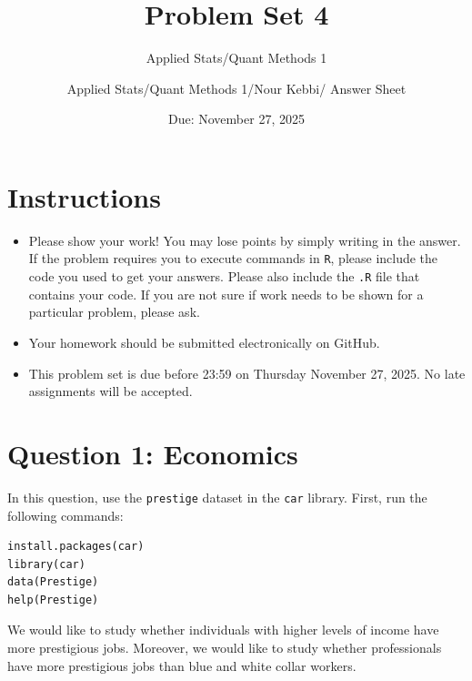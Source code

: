 \documentclass[12pt,letterpaper]{article}
\title{Problem Set 4}
\date{Due: November 27, 2025}
\author{Applied Stats/Quant Methods 1}
\author{Applied Stats/Quant Methods 1/Nour Kebbi/ Answer Sheet}
\begin{document}
	\maketitle
	\section*{Instructions}
	\begin{itemize}
		\item Please show your work! You may lose points by simply writing in the answer. If the problem requires you to execute commands in \texttt{R}, please include the code you used to get your answers. Please also include the \texttt{.R} file that contains your code. If you are not sure if work needs to be shown for a particular problem, please ask.
		\item Your homework should be submitted electronically on GitHub.
		\item This problem set is due before 23:59 on Thursday November 27, 2025. No late assignments will be accepted.
	\end{itemize}



	\vspace{.5cm}
\section*{Question 1: Economics}
\vspace{.25cm}
\noindent 	
In this question, use the \texttt{prestige} dataset in the \texttt{car} library. First, run the following commands:

\begin{verbatim}
install.packages(car)
library(car)
data(Prestige)
help(Prestige)
\end{verbatim} 


\noindent We would like to study whether individuals with higher levels of income have more prestigious jobs. Moreover, we would like to study whether professionals have more prestigious jobs than blue and white collar workers.
\end{document}
